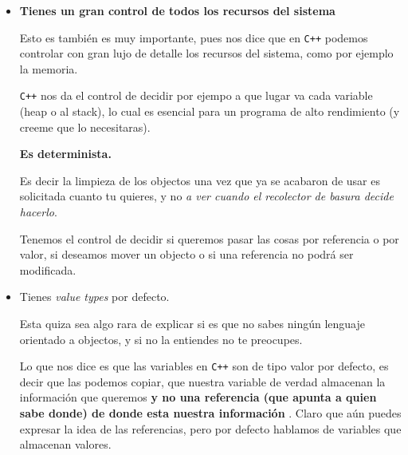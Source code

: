 \documentclass[12pt, fleqn]{report}                             %
\theoremstyle{break}                                            %
\newcommand \Cpp  {\texttt{C++} }                               %
\begin{document}
\begin{itemize}
                \clearpage

                \item \textbf{Tienes un gran control de todos los recursos del sistema}
                
                    Esto es también es muy importante, pues nos dice que en \Cpp podemos controlar con gran lujo de detalle
                    los recursos del sistema, como por ejemplo la memoria.

                    \Cpp nos da el control de decidir por ejempo a que lugar va cada variable (heap o al stack), 
                    lo cual es esencial para un programa de alto rendimiento (y creeme que lo necesitaras).

                    \textbf{Es determinista.}

                    Es decir la limpieza de los objectos una vez que ya se acabaron de usar es solicitada cuanto tu quieres,
                    y no \textit{a ver cuando el recolector de basura decide hacerlo}.

                    Tenemos el control de decidir si queremos pasar las cosas por referencia o por valor, si deseamos mover
                    un objecto o si una referencia no podrá ser modificada.

                \item {Tienes \textit{value types} por defecto}.
                
                    Esta quiza sea algo rara de explicar si es que no sabes ningún lenguaje orientado a objectos, y si
                    no la entiendes no te preocupes. 

                    Lo que nos dice es que las variables en \Cpp son de tipo valor por defecto, es decir que
                    las podemos copiar, que nuestra variable de verdad almacenan la información que queremos \textbf{
                        y no una referencia (que apunta a quien sabe donde) de donde esta nuestra información
                    }.
                    Claro que aún puedes expresar la idea de las referencias, pero por defecto hablamos de variables
                    que almacenan valores.

            \end{itemize}


        \clearpage
\end{document}
